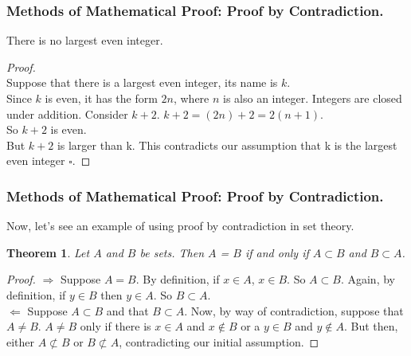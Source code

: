 \documentclass[aspectratio=169]{beamer}
\newtheorem{thm}{Theorem}
\numberwithin{equation}{section}
\begin{document}
\begin{frame}
\frametitle{Methods of Mathematical Proof: Proof by Contradiction.}

\begin{theorem}
There is no largest even integer.
\end{theorem}

\begin{proof}
\ \\Suppose that there is a largest even integer, its name is $k$. \pause
\ \\Since $k$ is even, it has the form $2n$, where $n$ is also an integer. \pause Integers are closed under addition.  Consider $k + 2$. $k + 2 = (2n) + 2 = 2 (n + 1)$. \pause
\ \\So $k + 2$ is even. \pause
\ \\But $k + 2$ is larger than k. This contradicts our assumption that k is the largest even integer $\square$.
\end{proof}

\end{frame}



\begin{frame}
\frametitle{Methods of Mathematical Proof: Proof by Contradiction.}

Now, let's see an example of using proof by contradiction in set theory. \pause

\begin{thm} Let $A$ and $B$ be sets.  Then $A$ = $B$ if and only if $A \subset B$ and $B \subset A$. \end{thm} \pause
\begin{proof} $\Rightarrow$ Suppose $A = B$.  By definition, if $x \in A$, $x \in B$.  So $A \subset B$.  Again, by definition, if $y \in B$ then $y \in A$.  So $B \subset A$. \pause  \\
$\Leftarrow$ Suppose $A \subset B$  and that $B \subset A$. \pause Now, by way of contradiction, suppose that $A \ne B$.  \pause $A \ne B$ only if there is $x \in A $ and $x \notin B$ or a $y \in B$ and $y \notin A$.  \pause But then, either $A \not\subset B$ or $B \not\subset A$, contradicting our initial assumption.
\end{proof}

\end{frame}
\end{document}

